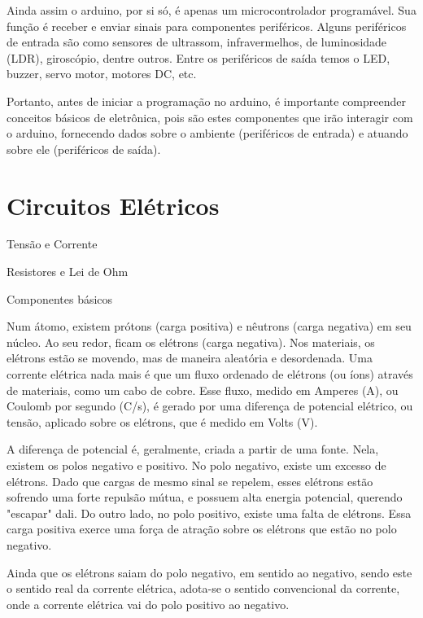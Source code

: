 \documentclass[lang=pt,11pt]{elegantbook}
\begin{document}
Ainda assim o arduino, por si só, é apenas um microcontrolador programável. Sua função é receber e enviar sinais para componentes periféricos. Alguns periféricos de entrada são como sensores de ultrassom, infravermelhos, de luminosidade (LDR), giroscópio, dentre outros. Entre os periféricos de saída temos o LED, buzzer, servo motor, motores DC, etc.

Portanto, antes de iniciar a programação no arduino, é importante compreender conceitos básicos de eletrônica, pois são estes componentes que irão interagir com o arduino, fornecendo dados sobre o ambiente (periféricos de entrada) e atuando sobre ele (periféricos de saída).

\chapter{Circuitos Elétricos}

\begin{introduction}
  \item Tensão e Corrente
  \item Resistores e Lei de Ohm
  \item Componentes básicos
\end{introduction}

Num átomo, existem prótons (carga positiva) e nêutrons (carga negativa) em seu núcleo. Ao seu redor, ficam os elétrons (carga negativa). Nos materiais, os elétrons estão se movendo, mas de maneira aleatória e desordenada. Uma corrente elétrica nada mais é que um fluxo ordenado de elétrons (ou íons) através de materiais, como um cabo de cobre. Esse fluxo, medido em Amperes (A), ou Coulomb por segundo (C/s), é gerado por uma diferença de potencial elétrico, ou tensão, aplicado sobre os elétrons, que é medido em Volts (V).

A diferença de potencial é, geralmente, criada a partir de uma fonte. Nela, existem os polos negativo e positivo. No polo negativo, existe um excesso de elétrons. Dado que cargas de mesmo sinal se repelem, esses elétrons estão sofrendo uma forte repulsão mútua, e possuem alta energia potencial, querendo "escapar" dali. Do outro lado, no polo positivo, existe uma falta de elétrons. Essa carga positiva exerce uma força de atração sobre os elétrons que estão no polo negativo.

Ainda que os elétrons saiam do polo negativo, em sentido ao negativo, sendo este o sentido real da corrente elétrica, adota-se o sentido convencional da corrente, onde a corrente elétrica vai do polo positivo ao negativo.
\end{document}
